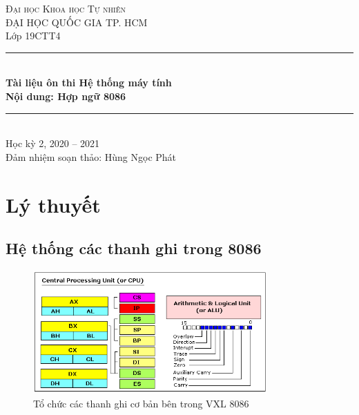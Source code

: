 \documentclass[12pt]{report}
\begin{document}
\begin{titlepage}
    \vspace*{\fill}

    \centering
    \textsc{\LARGE Đại học Khoa học Tự nhiên}\\[0.5cm]
    \textsc{\large ĐẠI HỌC QUỐC GIA TP. HCM}\\[0.5cm]
    
    {\Large Lớp 19CTT4}\\[1.5cm]

    \rule{\textwidth}{0.4pt} \\[0.4cm]
    {
        \huge \bfseries Tài liệu ôn thi Hệ thống máy tính\\
        Nội dung: Hợp ngữ 8086
    }
    \rule{\textwidth}{0.4pt}\\[1.5cm]
    
    {\Large Học kỳ 2, 2020 -- 2021}\\[1.5cm]
    Đảm nhiệm soạn thảo: Hùng Ngọc Phát
    \vspace*{\fill}

\end{titlepage}



\renewcommand*\contentsname{Mục lục}
\tableofcontents
\pagebreak

\chapter{Lý thuyết}
\pagebreak

\section{Hệ thống các thanh ghi trong 8086}

\begin{figure}[H]
    \centering
    \includegraphics[width=0.8\textwidth]{image/cpu.png}
    \caption{Tổ chức các thanh ghi cơ bản bên trong VXL 8086}
\end{figure}
\end{document}
